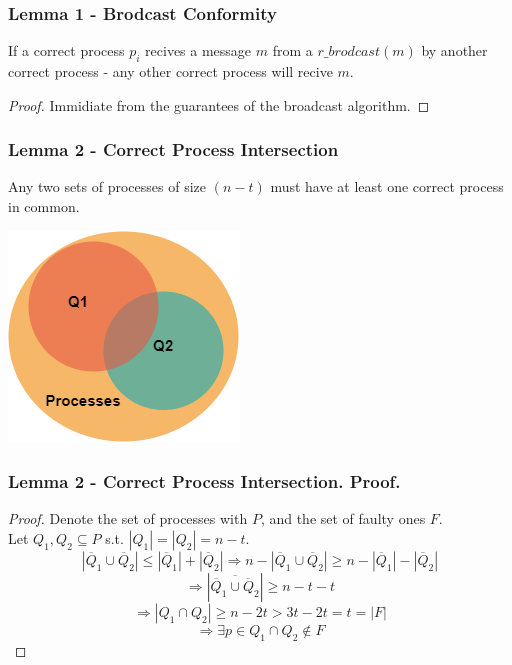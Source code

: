 \begin{frame}
    \frametitle{Lemma 1 - Brodcast Conformity}
    \begin{lemma}
        If a correct process $p_i$ recives a message $m$ from a $r\_brodcast(m)$ by another correct process - 
        any other correct process will recive $m$.\\
    \end{lemma}

    \begin{proof}
        Immidiate from the guarantees of the broadcast algorithm.
    \end{proof}
\end{frame}
\begin{frame}
    \frametitle{Lemma 2 - Correct Process Intersection}
    \begin{lemma}
        Any two sets of processes of size $(n-t)$ must have
        at least one correct process in common.
    \end{lemma}
    \begin{center}
        \includegraphics[scale=.5]{lemma2_venn.png}
    \end{center}
\end{frame}
\begin{frame}
    \frametitle{Lemma 2 - Correct Process Intersection. Proof.}
    \begin{proof}
        Denote the set of processes with $P$, and the set of faulty ones $F$.\\
        Let $Q_1,Q_2\subseteq P$ s.t. $|Q_1|=|Q_2|=n-t$.\\
        \[
            |\overline{Q}_1\cup\overline{Q}_2|\leq |\overline{Q}_1|+|\overline{Q}_2|
            \Rightarrow n-|\overline{Q}_1\cup\overline{Q}_2|\geq n-|\overline{Q}_1|-|\overline{Q}_2|
        \]\[
            \Rightarrow |\overline{\overline{Q}_1\cup\overline{Q}_2}|\geq n-t-t
        \]\[
            \Rightarrow |Q_1\cap Q_2|\geq n-2t>3t-2t=t=|F|
        \]\[
            \Rightarrow \exists p\in Q_1\cap Q_2\notin F
        \]
    \end{proof}
\end{frame}

